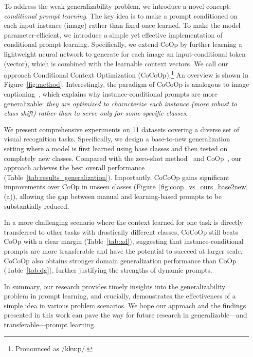 \documentclass[10pt,twocolumn,letterpaper]{article}
\begin{document}
To address the weak generalizability problem, we introduce a novel concept: \emph{conditional prompt learning}. The key idea is to make a prompt conditioned on each input instance (image) rather than fixed once learned. To make the model parameter-efficient, we introduce a simple yet effective implementation of conditional prompt learning. Specifically, we extend CoOp by further learning a lightweight neural network to generate for each image an input-conditional token (vector), which is combined with the learnable context vectors. We call our approach Conditional Context Optimization (CoCoOp).\footnote{Pronounced as /k\textschwa\textupsilon\textsecstress ku:p/.} An overview is shown in Figure~\ref{fig:method}. Interestingly, the paradigm of CoCoOp is analogous to image captioning~\cite{vinyals2015show}, which explains why instance-conditional prompts are more generalizable: \emph{they are optimized to characterize each instance (more robust to class shift) rather than to serve only for some specific classes}.

We present comprehensive experiments on 11 datasets covering a diverse set of visual recognition tasks. Specifically, we design a base-to-new generalization setting where a model is first learned using base classes and then tested on completely new classes. Compared with the zero-shot method~\cite{radford2021learning} and CoOp~\cite{zhou2021coop}, our approach achieves the best overall performance (Table~\ref{tab:results_generalization}). Importantly, CoCoOp gains significant improvements over CoOp in unseen classes (Figure~\ref{fig:coop_vs_ours_base2new}(a)), allowing the gap between manual and learning-based prompts to be substantially reduced.

In a more challenging scenario where the context learned for one task is directly transferred to other tasks with drastically different classes, CoCoOp still beats CoOp with a clear margin (Table~\ref{tab:xd}), suggesting that instance-conditional prompts are more transferable and have the potential to succeed at larger scale. CoCoOp also obtains stronger domain generalization performance than CoOp (Table~\ref{tab:dg}), further justifying the strengths of dynamic prompts.

In summary, our research provides timely insights into the generalizability problem in prompt learning, and crucially, demonstrates the effectiveness of a simple idea in various problem scenarios. We hope our approach and the findings presented in this work can pave the way for future research in generalizable---and transferable---prompt learning.
\end{document}
